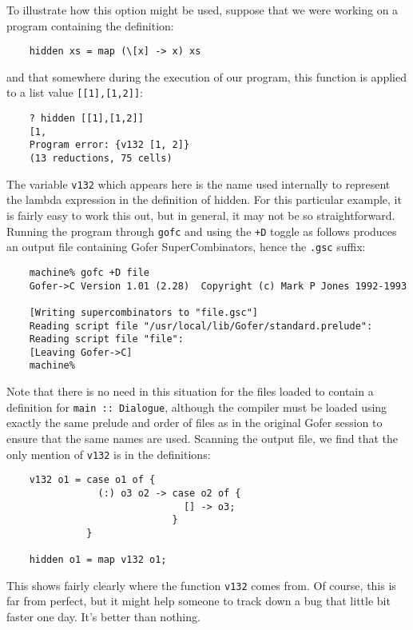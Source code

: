 To illustrate how this option might be used, suppose that we were working
on a program containing the definition:
\begin{verbatim}
    hidden xs = map (\[x] -> x) xs
\end{verbatim}
and that somewhere during the execution of our program, this function is
applied to a list value \verb"[[1],[1,2]]":
\begin{verbatim}
    ? hidden [[1],[1,2]]
    [1, 
    Program error: {v132 [1, 2]}
    (13 reductions, 75 cells)
\end{verbatim}
The variable \verb"v132" which appears here is the name used internally to
represent the lambda expression in the definition of hidden.  For this
particular example, it is fairly easy to work this out, but in general,
it may not be so straightforward.  Running the program through \verb"gofc" and
using the \verb"+D" toggle as follows produces an output file containing Gofer
SuperCombinators, hence the \verb".gsc" suffix:
\begin{verbatim}
    machine% gofc +D file
    Gofer->C Version 1.01 (2.28)  Copyright (c) Mark P Jones 1992-1993

    [Writing supercombinators to "file.gsc"]
    Reading script file "/usr/local/lib/Gofer/standard.prelude":
    Reading script file "file":
    [Leaving Gofer->C]
    machine% 
\end{verbatim}
Note that there is no need in this situation for the files loaded to
contain a definition for \verb"main :: Dialogue", although the compiler must
be loaded using exactly the same prelude and order of files as in the
original Gofer session to ensure that the same names are used.  Scanning
the output file, we find that the only mention of \verb"v132" is in the
definitions:
\begin{verbatim}
    v132 o1 = case o1 of {
                (:) o3 o2 -> case o2 of {
                               [] -> o3;
                             }
              }

    hidden o1 = map v132 o1;
\end{verbatim}
This shows fairly clearly where the function \verb"v132" comes from.  Of
course, this is far from perfect, but it might help someone to track
down a bug that little bit faster one day.  It's better than nothing.

